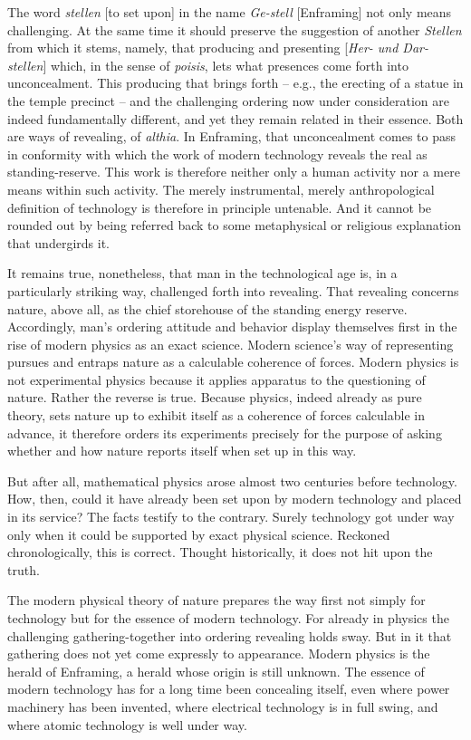 The word \textit{stellen} [to set upon] in the name \textit{Ge-stell} [Enframing] not only means challenging. At the same time it should preserve the suggestion of another \textit{Stellen} from which it stems, namely, that producing and presenting [\textit{Her- und Dar-stellen}] which, in the sense of \textit{poisis}, lets what presences come forth into unconcealment. This producing that brings forth -- e.g., the erecting of a statue in the temple precinct -- and the challenging ordering now under consideration are indeed fundamentally different, and yet they remain related in their essence. Both are ways of revealing, of \textit{althia}. In Enframing, that unconcealment comes to pass in conformity with which the work of modern technology reveals the real as standing-reserve. This work is therefore neither only a human activity nor a mere means within such activity. The merely instrumental, merely anthropological definition of technology is therefore in principle untenable. And it cannot be rounded out by being referred back to some metaphysical or religious explanation that undergirds it.

It remains true, nonetheless, that man in the technological age is, in a particularly striking way, challenged forth into revealing. That revealing concerns nature, above all, as the chief storehouse of the standing energy reserve. Accordingly, man's ordering attitude and behavior display themselves first in the rise of modern physics as an exact science. Modern science's way of representing pursues and entraps nature as a calculable coherence of forces. Modern physics is not experimental physics because it applies apparatus to the questioning of nature. Rather the reverse is true. Because physics, indeed already as pure theory, sets nature up to exhibit itself as a coherence of forces calculable in advance, it therefore orders its experiments precisely for the purpose of asking whether and how nature reports itself when set up in this way.

But after all, mathematical physics arose almost two centuries before technology. How, then, could it have already been set upon by modern technology and placed in its service? The facts testify to the contrary. Surely technology got under way only when it could be supported by exact physical science. Reckoned chronologically, this is correct. Thought historically, it does not hit upon the truth.

The modern physical theory of nature prepares the way first not simply for technology but for the essence of modern technology. For already in physics the challenging gathering-together into ordering revealing holds sway. But in it that gathering does not yet come expressly to appearance. Modern physics is the herald of Enframing, a herald whose origin is still unknown. The essence of modern technology has for a long time been concealing itself, even where power machinery has been invented, where electrical technology is in full swing, and where atomic technology is well under way.

